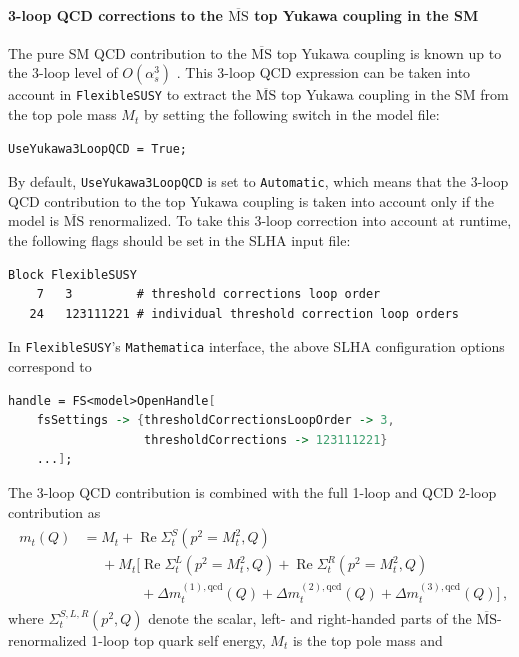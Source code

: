 \documentclass[final,3p,11pt,pdflatex]{elsarticle}
\makeatletter
\newcommand{\fs}{\texttt{FlexibleSUSY}\@\xspace}
\newcommand{\mathematica}{\texttt{Ma\-the\-ma\-ti\-ca}\xspace}
\newcommand{\code}[1]{\lstinline|#1|}  %
\newcommand{\ol}[1]{\overline{#1}}
\newcommand{\MSbar}{\ensuremath{\ol{\text{MS}}}\xspace}
\DeclareMathOperator{\re}{Re}
\def\as{\alpha_s}
\makeatother
\begin{document}
\paragraph{3-loop QCD corrections to the \MSbar top Yukawa coupling in the SM}

The pure SM QCD contribution to the \MSbar top Yukawa
coupling is known up to the 3-loop level of $O(\as^3)$
\cite{Chetyrkin:1999qi,Melnikov:2000qh}.  This 3-loop QCD expression
can be taken into account in \fs to extract the \MSbar top Yukawa
coupling in the SM from the top pole mass $M_t$ by setting
the following switch in the model file:
%
\begin{lstlisting}
UseYukawa3LoopQCD = True;
\end{lstlisting}
%
By default, \code{UseYukawa3LoopQCD} is set to \code{Automatic}, which
means that the 3-loop QCD contribution to the top Yukawa coupling is
taken into account only if the model is \MSbar renormalized.  To take
this 3-loop correction into account at runtime, the following flags
should be set in the SLHA input file:
%
\begin{lstlisting}
Block FlexibleSUSY
    7   3         # threshold corrections loop order
   24   123111221 # individual threshold correction loop orders
\end{lstlisting}
%
In \fs's \mathematica interface, the above SLHA configuration options
correspond to
%
\begin{lstlisting}[language=Mathematica]
handle = FS<model>OpenHandle[
    fsSettings -> {thresholdCorrectionsLoopOrder -> 3,
                   thresholdCorrections -> 123111221}
    ...];
\end{lstlisting}
%
The 3-loop QCD contribution is combined with the full 1-loop and QCD
2-loop contribution as
%
\begin{align}
\begin{split}
  m_t(Q) &= M_t + \re\Sigma_{t}^S(p^2=M_t^2,Q) \\
  &\phantom{={}} + M_t \Big[ \re\Sigma_{t}^L(p^2=M_t^2,Q) +
    \re\Sigma_{t}^R(p^2=M_t^2,Q) \\
  &\phantom{={} + M_t \Big[}
    + \Delta m_t^{(1),\text{qcd}}(Q) + \Delta m_t^{(2),\text{qcd}}(Q) + \Delta m_t^{(3),\text{qcd}}(Q) \Big]
  \,,
\end{split}
\end{align}
%
where $\Sigma_t^{S,L,R}(p^2,Q)$ denote the scalar, left- and
right-handed parts of the \MSbar-renormalized 1-loop top quark self
energy, $M_t$ is the top pole mass and
%
\end{document}
